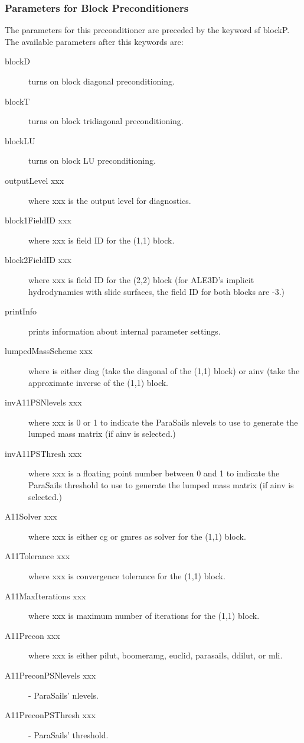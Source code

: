\subsubsection{Parameters for Block Preconditioners}
The parameters for this preconditioner are preceded by the keyword {sf blockP}.
The available parameters after this keywords are:
\begin{description}
\item[blockD] turns on block diagonal preconditioning.
\item[blockT] turns on block tridiagonal preconditioning.
\item[blockLU] turns on block LU preconditioning.
\item[outputLevel xxx] where xxx is the output level for diagnostics.
\item[block1FieldID xxx] where xxx is field ID for the (1,1) block.
\item[block2FieldID xxx] where xxx is field ID for the (2,2) block (for
    ALE3D's implicit hydrodynamics with slide surfaces, the field ID for
    both blocks are -3.)
\item[printInfo] prints information about internal parameter settings.
\item[lumpedMassScheme xxx] where is either {\sf diag} (take the diagonal
     of the (1,1) block) or {\sf ainv} (take the approximate inverse of
     the (1,1) block.
\item[invA11PSNlevels xxx] where xxx is 0 or 1 to indicate the ParaSails
     nlevels to use to generate the lumped mass matrix (if {\sf ainv} is
     selected.)
\item[invA11PSThresh xxx] where xxx is a floating point number between 0 
     and 1 to indicate the ParaSails threshold to use to generate the lumped 
     mass matrix (if {\sf ainv} is selected.)
\item[A11Solver xxx] where xxx is either {\sf cg} or {\sf gmres} as solver
     for the (1,1) block.
\item[A11Tolerance xxx] where xxx is convergence tolerance for the
     (1,1) block.
\item[A11MaxIterations xxx] where xxx is maximum number of iterations for
     the (1,1) block.
\item[A11Precon xxx] where xxx is either {\sf pilut}, {\sf boomeramg}, 
     {\sf euclid}, {\sf parasails}, {\sf ddilut}, or {\sf mli}.
\item[A11PreconPSNlevels xxx] - ParaSails' nlevels.
\item[A11PreconPSThresh xxx] - ParaSails' threshold. 

\end{description}
